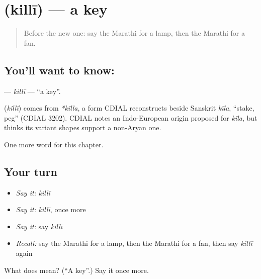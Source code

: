 \section[\texorpdfstring{\mr{किल्ली} (killī)}{किल्ली (killī)}]{ (killī) — a key}

\label{lesson:MR-C91-killi}



\begin{quote}
Before the new one: say the Marathi for a lamp, then the Marathi for a fan.
\end{quote}

\subsection*{You'll want to know: }
\textbf{} — \emph{killī} — \textquotedblleft{}a key\textquotedblright{}.

\begin{cousinweb}
\textbf{} (\emph{killī}) comes from \emph{*kīlla}, a form CDIAL reconstructs beside Sanskrit \emph{kīla}, \textquotedblleft{}stake, peg\textquotedblright{} (CDIAL 3202). CDIAL notes an Indo-European origin proposed for \emph{kīla}, but thinks its variant shapes support a non-Aryan one.
\end{cousinweb}

\begin{grammarlens}[title={What you've built}]
One more word for this chapter.
\end{grammarlens}

\subsection*{Your turn}
\begin{itemize}
\raggedright
  \item \emph{Say it:} \emph{killī}
  \item \emph{Say it:} \emph{killī}, once more
  \item \emph{Say it:} say \emph{killī}
  \item \emph{Recall:} say the Marathi for a lamp, then the Marathi for a fan, then say \emph{killī} again
\end{itemize}

\begin{tcolorbox}[breakable,colback=teal!4,colframe=teal!35!black,title={Before you move on}]
What does  mean? (\textquotedblleft{}A key\textquotedblright{}.) Say it once more.
\end{tcolorbox}
